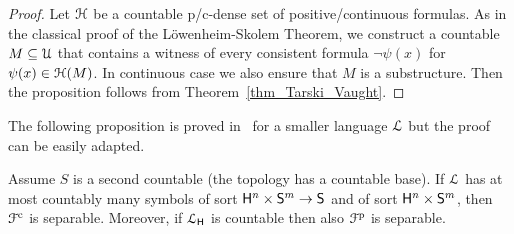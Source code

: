 \documentclass{amsproc}
\newcommand{\mylabel}[1]{{#1}\hfill}
\renewenvironment{itemize}
  {\begin{list}{$\triangleright$}{%
  \setlength{\parskip}{0mm}
  \setlength{\topsep}{.4\baselineskip}
  \setlength{\rightmargin}{0mm}
  \setlength{\listparindent}{0mm}
  \setlength{\itemindent}{0mm}
  \setlength{\labelwidth}{3ex}
  \setlength{\itemsep}{.2\baselineskip}
  \setlength{\parsep}{.2\baselineskip}
  \setlength{\partopsep}{0mm}
  \setlength{\labelsep}{1ex}
  \setlength{\leftmargin}{\labelwidth+\labelsep}
  \let\makelabel\mylabel}}{%
\end{list}}
\renewcommand*{\emph}[1]{%
   \smash{\tikz[baseline]\node[rectangle, fill=teal!25, rounded corners, inner xsep=0.5ex, inner ysep=0.2ex, anchor=base, minimum height = 2.7ex]{\strut #1};}}
\begin{document}
{\begin{proof}
  Let ${\EuScript H}$ be a countable p/c-dense set of positive/continuous formulas.
  As in the classical proof of the L\"owenheim-Skolem Theorem, we construct a countable $M\subseteq{\EuScript U}$ that contains a witness of every consistent formula $\neg\psi(x)$ for $\psi(x)\in{\EuScript H}(M)$.
  In continuous case we also ensure that $M$ is a substructure.
  Then the proposition follows from Theorem~\ref{thm_Tarski_Vaught}.
\end{proof}

The following proposition is proved in~\cite{clcl} for a smaller language ${\EuScript L}$ but the proof can be easily adapted.

\begin{proposition}
  Assume $S$ is a second countable (the topology has a countable base).
  If ${\EuScript L}$ has at most countably many symbols of sort ${\sf H}^n\times{\sf S}^m\to {\sf S}$ and of sort ${\sf H}^n\times{\sf S}^m$, then ${\EuScript F}^{\rm c}$ is separable.
  Moreover, if ${\EuScript L}_{\sf H}$ is countable then also ${\EuScript F}^{\rm p}$ is separable.
\end{proposition}












}
\end{document}
